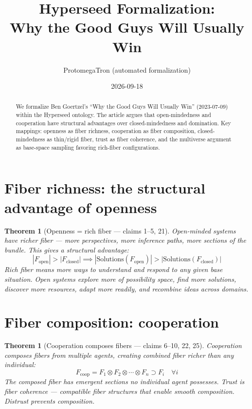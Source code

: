 \documentclass[11pt,a4paper]{article}
\title{Hyperseed Formalization:\\
  Why the Good Guys Will Usually Win}
\author{ProtomegaTron (automated formalization)}
\date{2026-09-18}
\newtheorem{theorem}[definition]{Theorem}
\begin{document}
\maketitle

\begin{abstract}
We formalize Ben Goertzel's ``Why the Good Guys Will Usually Win''
(2023-07-09) within the Hyperseed ontology. The article argues that
open-mindedness and cooperation have structural advantages over
closed-mindedness and domination. Key mappings: openness as fiber richness,
cooperation as fiber composition, closed-mindedness as thin/rigid fiber,
trust as fiber coherence, and the multiverse argument as base-space
sampling favoring rich-fiber configurations.
\end{abstract}

\tableofcontents

\section{Fiber richness: the structural advantage of openness}

\begin{theorem}[Openness = rich fiber --- claims 1--5, 21]
Open-minded systems have richer fiber --- more perspectives, more inference
paths, more sections of the bundle. This gives a structural advantage:
\[
  |F_{\text{open}}| > |F_{\text{closed}}| \implies
  |\text{Solutions}(F_{\text{open}})| > |\text{Solutions}(F_{\text{closed}})|
\]
Rich fiber means more ways to understand and respond to any given base
situation. Open systems explore more of possibility space, find more
solutions, discover more resources, adapt more readily, and recombine
ideas across domains.
\end{theorem}

\section{Fiber composition: cooperation}

\begin{theorem}[Cooperation composes fibers --- claims 6--10, 22, 25]
Cooperation composes fibers from multiple agents, creating combined fiber
richer than any individual:
\[
  F_{\text{coop}} = F_1 \otimes F_2 \otimes \cdots \otimes F_n
  \supset F_i \quad \forall i
\]
The composed fiber has emergent sections no individual agent possesses.
Trust is fiber coherence --- compatible fiber structures that enable smooth
composition. Distrust prevents composition.
\end{theorem}
\end{document}
